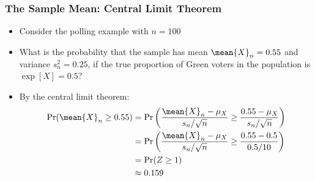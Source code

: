 \begin{frame}
\frametitle{The Sample Mean: Central Limit Theorem} 
\begin{itemize}
\item Consider the polling example with $n=100$
\item What is the probability that the sample has mean $\mean{X}_n = 0.55$ and variance $s_n^2 = 0.25$, if the true proportion of Green voters in the population is $\exp[X]=0.5$?
\item By the central limit theorem:
\begin{align*}
\Pr(\mean{X}_n \geq 0.55) 
    & = \Pr\left(\frac{\mean{X}_n-\mu_X}{s_n/\sqrt{n}} \geq \frac{0.55-\mu_X}{s_n/\sqrt{n}}\right)\\
    & = \Pr\left(\frac{\mean{X}_n -\mu_X}{s_n/\sqrt{n}} \geq \frac{0.55 - 0.5}{0.5/10} \right)\\
    & = \Pr(Z \geq 1)\\ 
    & \approx 0.159
\end{align*}
\end{itemize}
\end{frame}

